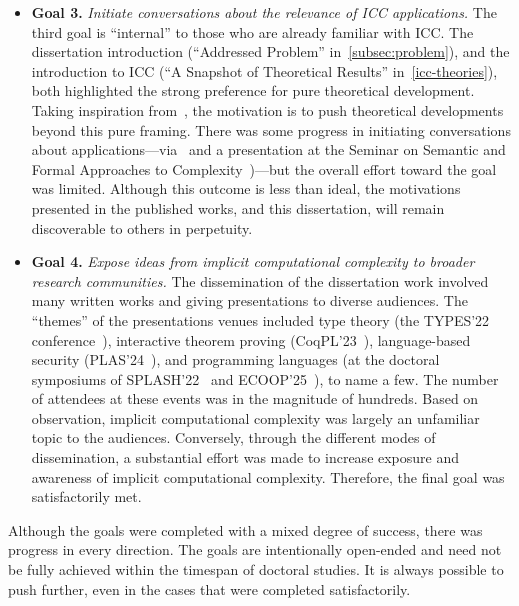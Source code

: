 \begin{itemize}
\item[\iconPROG]\textbf{Goal 3.}
    \emph{Initiate conversations about the relevance of ICC applications.}
    The third goal is \enquote{internal} to those who are already familiar with
    ICC. The dissertation introduction (\ie \enquote{Addressed Problem}
    in~\autoref{subsec:problem}), and the introduction to ICC (\enquote{A
    Snapshot of Theoretical Results} in~\autoref{icc-theories}), both
    highlighted the strong preference for pure theoretical development. Taking
    inspiration from~\cite{moyen2017}, the motivation is to push theoretical
    developments beyond this pure framing. There was some progress in initiating
    conversations about applications---via~\cite{aubert20222} and a presentation
    at the Seminar on Semantic and Formal Approaches to
    Complexity~\cite{scot23})---but the overall effort toward the goal was
    limited. Although this outcome is less than ideal, the motivations presented
    in the published works, and this dissertation, will remain discoverable to
    others in perpetuity.

\item[\iconDONE]\textbf{Goal 4.}
    \emph{Expose ideas from implicit computational complexity to broader research
          communities.}
    The dissemination of the dissertation work involved many written works and
    giving presentations to diverse audiences. The \enquote{themes} of the
    presentations venues included type theory (the TYPES'22
    conference~\textcite{aubert202217}), interactive theorem proving
    (CoqPL'23~\textcite{aubert20231}), language-based security
    (PLAS'24~\textcite{plas2024}), and programming languages (at the doctoral
    symposiums of SPLASH'22~\cite{splash22} and ECOOP'25~\cite{rusch20257}), to
    name a few. The number of attendees at these events was in the magnitude of
    hundreds. Based on observation, implicit computational complexity was
    largely an unfamiliar topic to the audiences. Conversely, through the
    different modes of dissemination, a substantial effort was made to increase
    exposure and awareness of implicit computational complexity. Therefore, the
    final goal was satisfactorily met.

\end{itemize}

Although the goals were completed with a mixed degree of success, there was
progress in every direction. The goals are intentionally open-ended and need not
be fully achieved within the timespan of doctoral studies. It is always possible
to push further, even in the cases that were completed satisfactorily.

